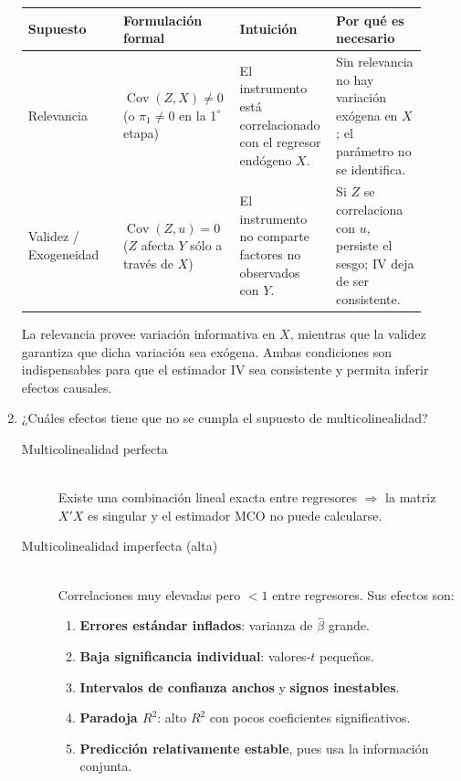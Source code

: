 \documentclass[10pt,a4paper]{article}
\begin{document}
\begin{enumerate}
\begin{table}[h!]
\centering
\begin{tabular}{|p{0.23\linewidth}|p{0.24\linewidth}|p{0.22\linewidth}|p{0.22\linewidth}|}
\hline
\textbf{Supuesto} & \textbf{Formulación formal} & \textbf{Intuición} & \textbf{Por qué es necesario} \\ \hline
Relevancia & $\operatorname{Cov}(Z,X)\neq 0$ \newline (o $\pi_1\neq 0$ en la 1$^{\text{ª}}$ etapa) & El instrumento está correlacionado con el regresor endógeno $X$. & Sin relevancia no hay variación exógena en $X$; el parámetro no se identifica. \\ \hline
Validez / Exogeneidad & $\operatorname{Cov}(Z,u)=0$ \newline ($Z$ afecta $Y$ sólo a través de $X$) & El instrumento no comparte factores no observados con $Y$. & Si $Z$ se correlaciona con $u$, persiste el sesgo; IV deja de ser consistente. \\ \hline

\end{tabular}
\end{table}

\noindent
La relevancia provee variación informativa en $X$, 
mientras que la validez garantiza que dicha variación sea exógena. 
Ambas condiciones son indispensables para que el estimador IV sea consistente y permita inferir efectos causales.

\item ¿Cuáles efectos tiene que no se cumpla el supuesto de multicolinealidad?

\begin{description}
  \item[Multicolinealidad perfecta] \hfill\\
        Existe una combinación lineal exacta entre regresores $\Rightarrow$ 
        la matriz $X'X$ es singular y el estimador MCO no puede calcularse.
  \item[Multicolinealidad imperfecta (alta)] \hfill\\
        Correlaciones muy elevadas pero $<1$ entre regresores.  Sus efectos son:
        \begin{enumerate}[label=\arabic*)]
          \item \textbf{Errores estándar inflados}: varianza de $\hat\beta$ grande.
          \item \textbf{Baja significancia individual}: valores-$t$ pequeños.
          \item \textbf{Intervalos de confianza anchos} y \textbf{signos inestables}.
          \item \textbf{Paradoja $R^{2}$}: alto $R^{2}$ con pocos coeficientes significativos.
          \item \textbf{Predicción relativamente estable}, pues usa la información conjunta.
        \end{enumerate}
\end{description}


\end{enumerate}
\end{document}
